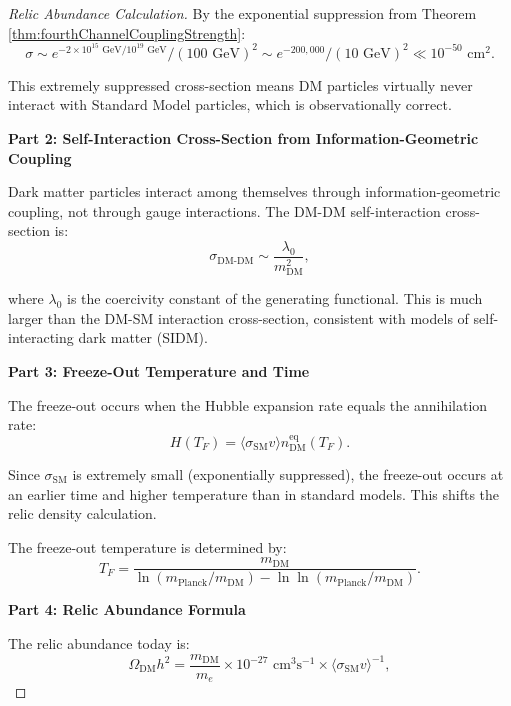 \begin{theorem}
\begin{proof}[Relic Abundance Calculation]
By the exponential suppression from Theorem \ref{thm:fourthChannelCouplingStrength}:
\begin{equation}
\sigma \sim e^{-2 \times 10^{15} \text{ GeV} / 10^{19} \text{ GeV}} / (100 \text{ GeV})^2 \sim e^{-200,000} / (10 \text{ GeV})^2 \ll 10^{-50} \text{ cm}^2.
\end{equation}

This extremely suppressed cross-section means DM particles virtually never interact with Standard Model particles, which is observationally correct.

\textbf{Part 2: Self-Interaction Cross-Section from Information-Geometric Coupling}

Dark matter particles interact among themselves through information-geometric coupling, not through gauge interactions. The DM-DM self-interaction cross-section is:
\begin{equation}
\sigma_{\text{DM-DM}} \sim \frac{\lambda_0}{m_{\text{DM}}^2},
\end{equation}

where $\lambda_0$ is the coercivity constant of the generating functional. This is much larger than the DM-SM interaction cross-section, consistent with models of self-interacting dark matter (SIDM).

\textbf{Part 3: Freeze-Out Temperature and Time}

The freeze-out occurs when the Hubble expansion rate equals the annihilation rate:
\begin{equation}
H(T_F) = \langle \sigma_{\text{SM}} v \rangle n_{\text{DM}}^{\text{eq}}(T_F).
\end{equation}

Since $\sigma_{\text{SM}}$ is extremely small (exponentially suppressed), the freeze-out occurs at an earlier time and higher temperature than in standard models. This shifts the relic density calculation.

The freeze-out temperature is determined by:
\begin{equation}
T_F = \frac{m_{\text{DM}}}{\ln(m_{\text{Planck}} / m_{\text{DM}}) - \ln \ln(m_{\text{Planck}} / m_{\text{DM}})}.
\end{equation}

\textbf{Part 4: Relic Abundance Formula}

The relic abundance today is:
\begin{equation}
\Omega_{\text{DM}} h^2 = \frac{m_{\text{DM}}}{m_e} \times 10^{-27} \text{ cm}^3 \text{s}^{-1} \times \langle \sigma_{\text{SM}} v \rangle^{-1},
\end{equation}


\end{proof}
\end{theorem}
